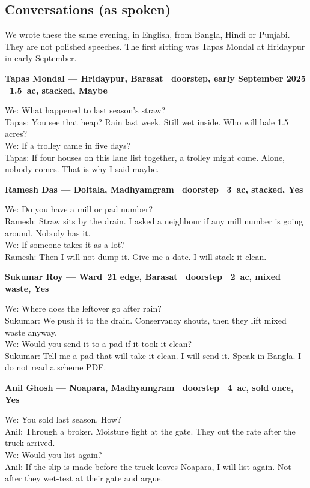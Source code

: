 \documentclass[12pt,a4paper]{article}
\newenvironment{conv}[1]{%
  \par\vspace{0.55em}%
  {\small\bfseries #1}\par\vspace{0.2em}%
  \noindent{\vrule width 2.4pt}\hspace{0.65em}%
  \begin{minipage}[t]{\dimexpr\linewidth-1.0em\relax}\small
}{%
  \end{minipage}\par\vspace{0.25em}%
}
\begin{document}
\subsection{Conversations (as spoken)}
We wrote these the same evening, in English, from Bangla, Hindi or Punjabi. They are not polished speeches. The first sitting was Tapas Mondal at Hridaypur in early September.

\begin{conv}{Tapas Mondal --- Hridaypur, Barasat \textbullet\ doorstep, early September 2025 \textbullet\ 1.5~ac, stacked, Maybe}
We: What happened to last season's straw?\\
Tapas: You see that heap? Rain last week. Still wet inside. Who will bale 1.5 acres?\\
We: If a trolley came in five days?\\
Tapas: If four houses on this lane list together, a trolley might come. Alone, nobody comes. That is why I said maybe.
\end{conv}

\begin{conv}{Ramesh Das --- Doltala, Madhyamgram \textbullet\ doorstep \textbullet\ 3~ac, stacked, Yes}
We: Do you have a mill or pad number?\\
Ramesh: Straw sits by the drain. I asked a neighbour if any mill number is going around. Nobody has it.\\
We: If someone takes it as a lot?\\
Ramesh: Then I will not dump it. Give me a date. I will stack it clean.
\end{conv}

\begin{conv}{Sukumar Roy --- Ward~21 edge, Barasat \textbullet\ doorstep \textbullet\ 2~ac, mixed waste, Yes}
We: Where does the leftover go after rain?\\
Sukumar: We push it to the drain. Conservancy shouts, then they lift mixed waste anyway.\\
We: Would you send it to a pad if it took it clean?\\
Sukumar: Tell me a pad that will take it clean. I will send it. Speak in Bangla. I do not read a scheme PDF.
\end{conv}

\begin{conv}{Anil Ghosh --- Noapara, Madhyamgram \textbullet\ doorstep \textbullet\ 4~ac, sold once, Yes}
We: You sold last season. How?\\
Anil: Through a broker. Moisture fight at the gate. They cut the rate after the truck arrived.\\
We: Would you list again?\\
Anil: If the slip is made before the truck leaves Noapara, I will list again. Not after they wet-test at their gate and argue.
\end{conv}
\end{document}
